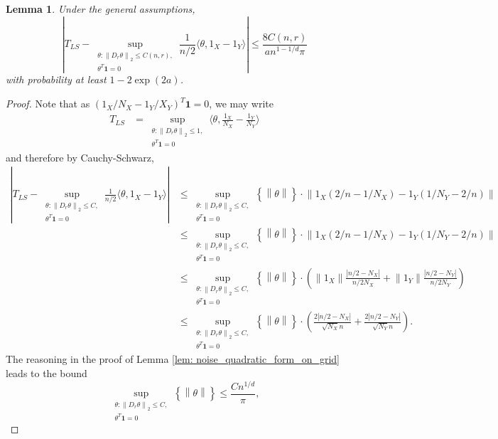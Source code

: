 \documentclass{article}
\newcommand{\norm}[1]{\left\lVert#1\right\rVert}
\newcommand{\abs}[1]{\left \lvert #1 \right \rvert}
\newcommand{\set}[1]{\left\{#1\right\}}
\newcommand{\dotp}[2]{\langle #1, #2 \rangle}
\newcommand{\1}{\mathbb{I}}
\theoremstyle{alden}
\theoremstyle{aldenthm}
\newtheorem{lemma}{Lemma}
\theoremstyle{definition}
\theoremstyle{remark}
\begin{document}
\begin{lemma}
	\label{lem: normalization_error}
	Under the general assumptions,
	\begin{equation*}
	\abs{T_{LS} - \sup_{\substack{\theta: \norm{D_r \theta}_2 \leq C(n,r), \\ \theta^T \mathbf{1} = 0} } \frac{1}{n/2}\dotp{\theta}{1_X - 1_Y}} \leq \frac{8C(n,r)}{a n^{1 - 1/d}\pi}
	\end{equation*}
	with probability at least $1 - 2 \exp(2a)$. 
\end{lemma}
\begin{proof}
	Note that as $(1_X/N_X - 1_Y/X_Y)^T \mathbf{1} = 0$, we may write
	\begin{align*}
	T_{LS} & = \sup_{\substack{\theta: \norm{D_r \theta}_2 \leq 1, \\ \theta^T \mathbf{1} = 0} } \dotp{\theta}{\frac{1_X}{N_X} - \frac{1_Y}{N_Y}}
	\end{align*}
	and therefore by Cauchy-Schwarz,
	\begin{align*}
	\abs{T_{LS} - \sup_{\substack{\theta: \norm{D_r \theta}_2 \leq C, \\ \theta^T \mathbf{1} = 0} } \frac{1}{n/2}\dotp{\theta}{1_X - 1_Y}}  & \leq \sup_{\substack{\theta: \norm{D_r \theta}_2 \leq C, \\ \theta^T \mathbf{1} = 0} } \set{\norm{\theta}} \cdot \norm{1_X(2/n - 1/N_X) - 1_Y(1/N_Y - 2/n)} \\
	& \leq \sup_{\substack{\theta: \norm{D_r \theta}_2 \leq C, \\ \theta^T \mathbf{1} = 0} } \set{\norm{\theta}} \cdot \norm{1_X(2/n - 1/N_X) - 1_Y(1/N_Y - 2/n)} \\
	& \leq \sup_{\substack{\theta: \norm{D_r \theta}_2 \leq C, \\ \theta^T \mathbf{1} = 0} } \set{\norm{\theta}} \cdot \left(\norm{1_X} \frac{\abs{n/2 - N_X}}{n/2 N_X} + \norm{1_Y} \frac{\abs{n/2 - N_Y}}{n/2 N_Y}\right) \\
	& \leq \sup_{\substack{\theta: \norm{D_r \theta}_2 \leq C, \\ \theta^T \mathbf{1} = 0} } \set{\norm{\theta}} \cdot \left(\frac{2\abs{n/2 - N_X}}{\sqrt{N_X} n} + \frac{2\abs{n/2 - N_Y}}{\sqrt{N_Y} n} \right).
	\end{align*}
	The reasoning in the proof of Lemma \ref{lem: noise_quadratic_form_on_grid} leads to the bound
	\begin{equation*}
	\sup_{\substack{\theta: \norm{D_r \theta}_2 \leq C, \\ \theta^T \mathbf{1} = 0} } \set{\norm{\theta}} \leq \frac{C n^{1/d}}{\pi},

\end{equation*}
\end{proof}
\end{document}
